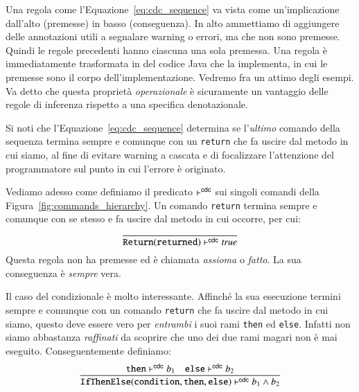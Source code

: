 Una regola come l'Equazione~\eqref{eq:cdc_sequence}
va vista come un'implicazione dall'alto (premesse) in basso
(conseguenza). In alto ammettiamo di aggiungere delle annotazioni utili
a segnalare warning o errori, ma che non sono premesse. Quindi le regole
precedenti hanno ciascuna una sola premessa. Una regola \`e immediatamente
trasformata in del codice Java che la implementa, in cui le premesse sono
il corpo dell'implementazione. Vedremo fra un attimo degli esempi.
Va detto che questa propriet\`a \emph{operazionale} \`e sicuramente un
vantaggio delle regole di inferenza rispetto a una specifica denotazionale.

Si noti che l'Equazione~\eqref{eq:cdc_sequence} determina se
l'\emph{ultimo} comando della sequenza termina sempre e comunque con un
\texttt{return} che fa uscire dal metodo in cui siamo,
al fine di evitare warning a cascata e di focalizzare
l'attenzione del programmatore sul punto in cui l'errore \`e originato.

Vediamo adesso come definiamo il predicato $\vdash^{\mathsf{cdc}}$ sui singoli comandi
della Figura~\ref{fig:commands_hierarchy}. Un comando \texttt{return}
termina sempre e comunque con se stesso e fa uscire dal metodo in cui
occorre, per cui:
%
\[
  \frac{}{\mathtt{Return(returned)}\vdash^{\mathsf{cdc}}\mathit{true}}
\]
%
Questa regola non ha premesse ed \`e chiamata \emph{assioma} o \emph{fatto}.
La sua conseguenza \`e \emph{sempre} vera.

Il caso del condizionale \`e molto interessante. Affinch\'e la sua esecuzione
termini sempre e comunque con un comando \texttt{return} che fa uscire
dal metodo in cui siamo, questo deve essere
vero per \emph{entrambi} i suoi rami \texttt{then} ed \texttt{else}. Infatti
non siamo abbastanza \emph{raffinati} da scoprire che uno dei due
rami magari non \`e mai eseguito. Conseguentemente definiamo:
%
\begin{equation}\label{eq:cdc_ifthenelse}
  \frac{\mathtt{then}\vdash^{\mathsf{cdc}} b_1\quad\mathtt{else}\vdash^{\mathsf{cdc}} b_2}
    {\mathtt{IfThenElse(condition,then,else)}\vdash^{\mathsf{cdc}} b_1\wedge b_2}
\end{equation}

